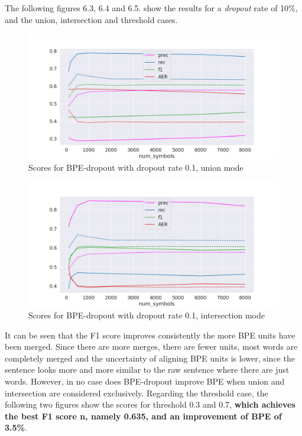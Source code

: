 The following figures 6.3, 6.4 and 6.5. show the results for a \emph{dropout} rate of 10\%, and the union, intersection and threshold cases.

 \begin{figure}[!ht]
     \centering
     \includegraphics[width=13cm]{../reports/scores_dropout_bpe/space/0.1/eng_deu_union_fastalign.png}
     \caption{Scores for BPE-dropout with dropout rate 0.1, union mode}
 \end{figure}
 
 \begin{figure}[!ht]
     \centering
     \includegraphics[width=13cm]{../reports/scores_dropout_bpe/space/0.1/eng_deu_inter_fastalign.png}
     \caption{Scores for BPE-dropout with dropout rate 0.1, intersection mode}
 \end{figure}

It can be seen that the F1 score improves consistently the more BPE units have been merged. Since there are more merges, there are fewer units, most words are completely merged and the uncertainty of aligning BPE units is lower, since the sentence looks more and more similar to the raw sentence where there are just words. However, in no case does BPE-dropout improve BPE when union and intersection are considered exclusively. Regarding the threshold case, the following two figures show the scores for threshold 0.3 and 0.7, \textbf{which achieves the best F1 score n, namely 0.635, and an improvement of BPE of 3.5\%}.


